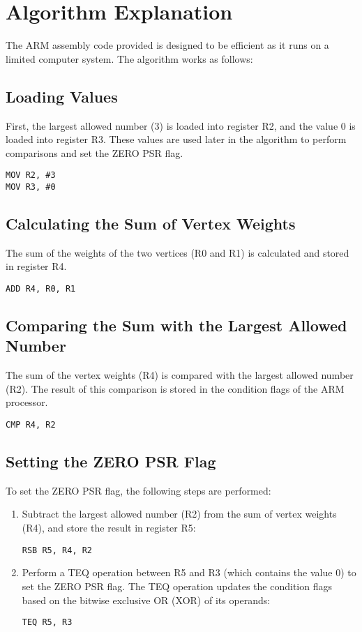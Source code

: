 \section{Algorithm Explanation}
The ARM assembly code provided is designed to be efficient as it runs on a limited computer system. The algorithm works as follows:

\subsection{Loading Values}
First, the largest allowed number (3) is loaded into register R2, and the value 0 is loaded into register R3. These values are used later in the algorithm to perform comparisons and set the ZERO PSR flag.

\begin{verbatim}
MOV R2, #3
MOV R3, #0
\end{verbatim}

\subsection{Calculating the Sum of Vertex Weights}
The sum of the weights of the two vertices (R0 and R1) is calculated and stored in register R4.

\begin{verbatim}
ADD R4, R0, R1
\end{verbatim}

\subsection{Comparing the Sum with the Largest Allowed Number}
The sum of the vertex weights (R4) is compared with the largest allowed number (R2). The result of this comparison is stored in the condition flags of the ARM processor.

\begin{verbatim}
CMP R4, R2
\end{verbatim}

\subsection{Setting the ZERO PSR Flag}
To set the ZERO PSR flag, the following steps are performed:

\begin{enumerate}
\item Subtract the largest allowed number (R2) from the sum of vertex weights (R4), and store the result in register R5:

\begin{verbatim}
RSB R5, R4, R2
\end{verbatim}

\item Perform a TEQ operation between R5 and R3 (which contains the value 0) to set the ZERO PSR flag. The TEQ operation updates the condition flags based on the bitwise exclusive OR (XOR) of its operands:

\begin{verbatim}
TEQ R5, R3
\end{verbatim}
\end{enumerate}


